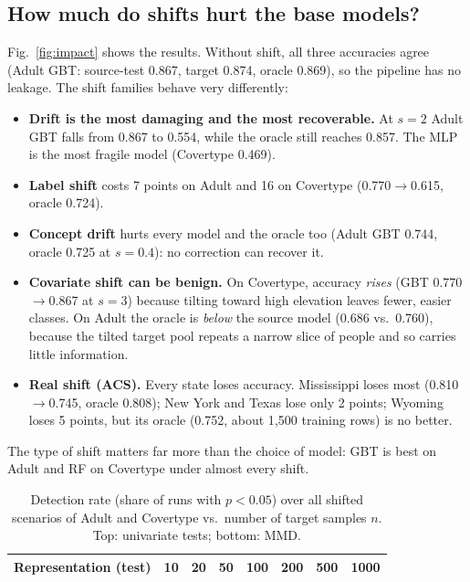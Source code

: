 \documentclass[conference]{IEEEtran}
\begin{document}
\subsection{How much do shifts hurt the base models?}
Fig.~\ref{fig:impact} shows the results. Without shift, all three accuracies agree (Adult GBT: source-test 0.867, target 0.874, oracle 0.869), so the pipeline has no leakage. The shift families behave very differently:
\begin{itemize}
\item \textbf{Drift is the most damaging and the most recoverable.} At $s=2$ Adult GBT falls from 0.867 to 0.554, while the oracle still reaches 0.857. The MLP is the most fragile model (Covertype 0.469).
\item \textbf{Label shift} costs 7 points on Adult and 16 on Covertype (0.770$\to$0.615, oracle 0.724).
\item \textbf{Concept drift} hurts every model and the oracle too (Adult GBT 0.744, oracle 0.725 at $s=0.4$): no correction can recover it.
\item \textbf{Covariate shift can be benign.} On Covertype, accuracy \emph{rises} (GBT 0.770$\to$0.867 at $s=3$) because tilting toward high elevation leaves fewer, easier classes. On Adult the oracle is \emph{below} the source model (0.686 vs.\ 0.760), because the tilted target pool repeats a narrow slice of people and so carries little information.
\item \textbf{Real shift (ACS).} Every state loses accuracy. Mississippi loses most (0.810$\to$0.745, oracle 0.808); New York and Texas lose only 2 points; Wyoming loses 5 points, but its oracle (0.752, about 1{,}500 training rows) is no better.
\end{itemize}
The type of shift matters far more than the choice of model: GBT is best on Adult and RF on Covertype under almost every shift.

\begin{table}[t]
\centering
\caption{Detection rate (share of runs with $p<0.05$) over all shifted scenarios of Adult and Covertype vs.\ number of target samples $n$. Top: univariate tests; bottom: MMD.}
\label{tab:detection}
\footnotesize\setlength{\tabcolsep}{3.2pt}
\begin{tabular}{lccccccc}
\toprule
Representation (test) & 10 & 20 & 50 & 100 & 200 & 500 & 1000 \\
\midrule

\bottomrule
\end{tabular}
\end{table}
\end{document}
